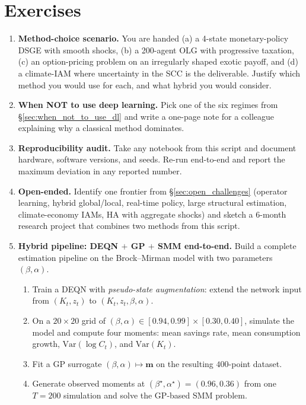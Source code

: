 \documentclass[11pt,a4paper]{report}
\begin{document}
\section*{Exercises}
\begin{enumerate}[itemsep=4pt, leftmargin=*]
\item\label{ex:ch12:1} \textbf{Method-choice scenario.}  You are handed (a) a 4-state monetary-policy DSGE with smooth shocks, (b) a 200-agent OLG with progressive taxation, (c) an option-pricing problem on an irregularly shaped exotic payoff, and (d) a climate-IAM where uncertainty in the SCC is the deliverable.  Justify which method you would use for each, and what hybrid you would consider.
\item\label{ex:ch12:2} \textbf{When NOT to use deep learning.}  Pick one of the six regimes from \S\ref{sec:when_not_to_use_dl} and write a one-page note for a colleague explaining why a classical method dominates.
\item\label{ex:ch12:3} \textbf{Reproducibility audit.}  Take any notebook from this script and document hardware, software versions, and seeds.  Re-run end-to-end and report the maximum deviation in any reported number.
\item\label{ex:ch12:4} \textbf{Open-ended.}  Identify one frontier from \S\ref{sec:open_challenges} (operator learning, hybrid global/local, real-time policy, large structural estimation, climate-economy IAMs, HA with aggregate shocks) and sketch a 6-month research project that combines two methods from this script.
\item\label{ex:ch12:5} \textbf{Hybrid pipeline: DEQN $+$ GP $+$ SMM end-to-end.}  Build a complete estimation pipeline on the Brock--Mirman model with two parameters $(\beta, \alpha)$.
\begin{enumerate}[label=(\roman*), itemsep=2pt]
\item Train a DEQN with \emph{pseudo-state augmentation}: extend the network input from $(K_t, z_t)$ to $(K_t, z_t, \beta, \alpha)$.
\item On a $20\times 20$ grid of $(\beta, \alpha) \in [0.94, 0.99] \times [0.30, 0.40]$, simulate the model and compute four moments: mean savings rate, mean consumption growth, $\mathrm{Var}(\log C_t)$, and $\mathrm{Var}(K_t)$.
\item Fit a GP surrogate $(\beta, \alpha) \mapsto \bm m$ on the resulting $400$-point dataset.
\item Generate observed moments at $(\beta^\star,\alpha^\star)=(0.96,0.36)$ from one $T=200$ simulation and solve the GP-based SMM problem.

\end{enumerate}
\end{enumerate}
\end{document}

